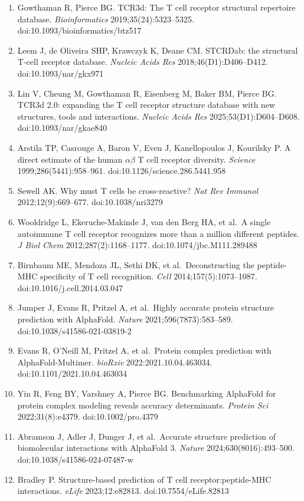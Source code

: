 \documentclass[
  11pt,
]{article}
\begin{document}
\begin{enumerate}
\item
  Gowthaman R, Pierce BG. TCR3d: The T cell receptor structural repertoire database. \emph{Bioinformatics} 2019;35(24):5323--5325. doi:10.1093/bioinformatics/btz517
\item
  Leem J, de Oliveira SHP, Krawczyk K, Deane CM. STCRDab: the structural T-cell receptor database. \emph{Nucleic Acids Res} 2018;46(D1):D406--D412. doi:10.1093/nar/gkx971
\item
  Lin V, Cheung M, Gowthaman R, Eisenberg M, Baker BM, Pierce BG. TCR3d 2.0: expanding the T cell receptor structure database with new structures, tools and interactions. \emph{Nucleic Acids Res} 2025;53(D1):D604--D608. doi:10.1093/nar/gkae840
\item
  Arstila TP, Casrouge A, Baron V, Even J, Kanellopoulos J, Kourilsky P. A direct estimate of the human \ensuremath{\alpha}\ensuremath{\beta} T cell receptor diversity. \emph{Science} 1999;286(5441):958--961. doi:10.1126/science.286.5441.958
\item
  Sewell AK. Why must T cells be cross-reactive? \emph{Nat Rev Immunol} 2012;12(9):669--677. doi:10.1038/nri3279
\item
  Wooldridge L, Ekeruche-Makinde J, van den Berg HA, et al.~A single autoimmune T cell receptor recognizes more than a million different peptides. \emph{J Biol Chem} 2012;287(2):1168--1177. doi:10.1074/jbc.M111.289488
\item
  Birnbaum ME, Mendoza JL, Sethi DK, et al.~Deconstructing the peptide-MHC specificity of T cell recognition. \emph{Cell} 2014;157(5):1073--1087. doi:10.1016/j.cell.2014.03.047
\item
  Jumper J, Evans R, Pritzel A, et al.~Highly accurate protein structure prediction with AlphaFold. \emph{Nature} 2021;596(7873):583--589. doi:10.1038/s41586-021-03819-2
\item
  Evans R, O'Neill M, Pritzel A, et al.~Protein complex prediction with AlphaFold-Multimer. \emph{bioRxiv} 2022:2021.10.04.463034. doi:10.1101/2021.10.04.463034
\item
  Yin R, Feng BY, Varshney A, Pierce BG. Benchmarking AlphaFold for protein complex modeling reveals accuracy determinants. \emph{Protein Sci} 2022;31(8):e4379. doi:10.1002/pro.4379
\item
  Abramson J, Adler J, Dunger J, et al.~Accurate structure prediction of biomolecular interactions with AlphaFold 3. \emph{Nature} 2024;630(8016):493--500. doi:10.1038/s41586-024-07487-w
\item
  Bradley P. Structure-based prediction of T cell receptor:peptide-MHC interactions. \emph{eLife} 2023;12:e82813. doi:10.7554/eLife.82813

\end{enumerate}
\end{document}
